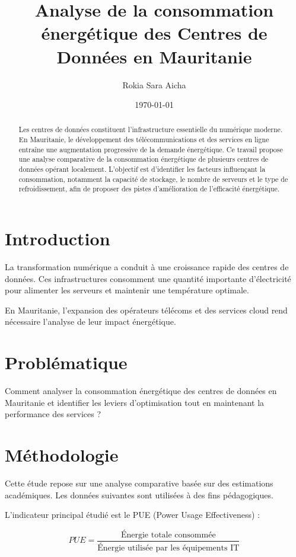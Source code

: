 \documentclass[12pt,a4paper]{article}
\title{Analyse de la consommation énergétique des Centres de Données en Mauritanie}
\author{Rokia  \And Sara \And Aicha }
\date{\today}
\begin{document}
\maketitle

\begin{abstract}
Les centres de données constituent l’infrastructure essentielle du numérique moderne. 
En Mauritanie, le développement des télécommunications et des services en ligne 
entraîne une augmentation progressive de la demande énergétique. 
Ce travail propose une analyse comparative de la consommation énergétique 
de plusieurs centres de données opérant localement. 
L’objectif est d’identifier les facteurs influençant la consommation, 
notamment la capacité de stockage, le nombre de serveurs et le type de refroidissement, 
afin de proposer des pistes d’amélioration de l’efficacité énergétique.
\end{abstract}

\section{Introduction}

La transformation numérique a conduit à une croissance rapide des centres de données. 
Ces infrastructures consomment une quantité importante d’électricité 
pour alimenter les serveurs et maintenir une température optimale. 

En Mauritanie, l’expansion des opérateurs télécoms et des services cloud 
rend nécessaire l’analyse de leur impact énergétique.

\section{Problématique}

Comment analyser la consommation énergétique des centres de données en Mauritanie 
et identifier les leviers d’optimisation tout en maintenant la performance des services ?

\section{Méthodologie}

Cette étude repose sur une analyse comparative basée sur des estimations académiques. 
Les données suivantes sont utilisées à des fins pédagogiques.

L’indicateur principal étudié est le PUE (Power Usage Effectiveness) :

\[
PUE = \frac{\text{Énergie totale consommée}}{\text{Énergie utilisée par les équipements IT}}
\]
\end{document}
